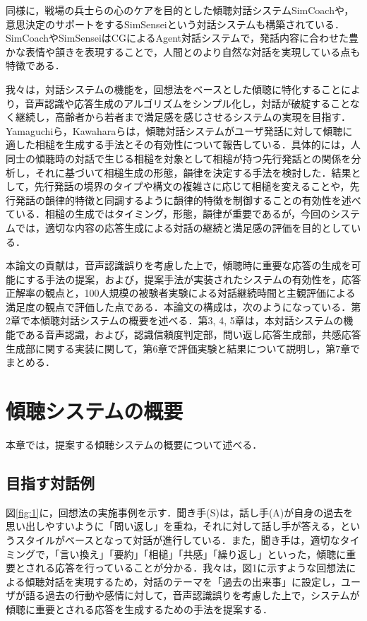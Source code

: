 \documentclass[japanese]{jnlp_1.4}
\begin{document}
同様に，戦場の兵士らの心のケアを目的とした傾聴対話システムSimCoachや，意思決定のサポートをするSimSenseiという対話システムも構築されている\cite{no28,no29}．SimCoachやSimSenseiはCGによるAgent対話システムで，発話内容に合わせた豊かな表情や頷きを表現することで，人間とのより自然な対話を実現している点も特徴である．

我々は，対話システムの機能を，回想法をベースとした傾聴に特化することにより，音声認識や応答生成のアルゴリズムをシンプル化し，対話が破綻することなく継続し，高齢者から若者まで満足感を感じさせるシステムの実現を目指す．Yamaguchiら，Kawaharaらは，傾聴対話システムがユーザ発話に対して傾聴に適した相槌を生成する手法とその有効性について報告している\cite{no30,no34}．具体的には，人同士の傾聴時の対話で生じる相槌を対象として相槌が持つ先行発話との関係を分析し，それに基づいて相槌生成の形態，韻律を決定する手法を検討した．結果として，先行発話の境界のタイプや構文の複雑さに応じて相槌を変えることや，先行発話の韻律的特徴と同調するように韻律的特徴を制御することの有効性を述べている．相槌の生成ではタイミング，形態，韻律が重要であるが，今回のシステムでは，適切な内容の応答生成による対話の継続と満足感の評価を目的としている．

本論文の貢献は，音声認識誤りを考慮した上で，傾聴時に重要な応答の生成を可能にする手法の提案，および，提案手法が実装されたシステムの有効性を，応答正解率の観点と，100人規模の被験者実験による対話継続時間と主観評価による満足度の観点で評価した点である．本論文の構成は，次のようになっている．第2章で本傾聴対話システムの概要を述べる．第3, 4, 5章は，本対話システムの機能である音声認識，および，認識信頼度判定部，問い返し応答生成部，共感応答生成部に関する実装に関して，第6章で評価実験と結果について説明し，第7章でまとめる．


\section{傾聴システムの概要}

本章では，提案する傾聴システムの概要について述べる．
 
\subsection{目指す対話例}

図\ref{fig:1}に，回想法の実施事例を示す\cite{no32}．聞き手(S)は，話し手(A)が自身の過去を思い出しやすいように「問い返し」を重ね，それに対して話し手が答える，というスタイルがベースとなって対話が進行している．また，聞き手は，適切なタイミングで，「言い換え」「要約」「相槌」「共感」「繰り返し」といった，傾聴に重要とされる応答を行っていることが分かる．我々は，図1に示すような回想法による傾聴対話を実現するため，対話のテーマを「過去の出来事」に設定し，ユーザが語る過去の行動や感情に対して，音声認識誤りを考慮した上で，システムが傾聴に重要とされる応答を生成するための手法を提案する．
\end{document}
